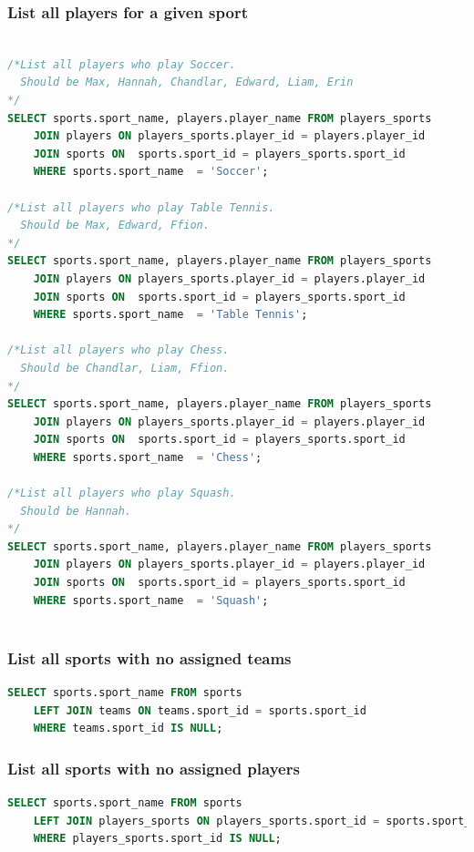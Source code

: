 \documentclass[11pt, article]{article}
\begin{document}
	\subsubsection{List all players for a given sport}
	\begin{lstlisting}[language=sql]

/*List all players who play Soccer.
  Should be Max, Hannah, Chandlar, Edward, Liam, Erin
*/
SELECT sports.sport_name, players.player_name FROM players_sports
	JOIN players ON players_sports.player_id = players.player_id
	JOIN sports ON  sports.sport_id = players_sports.sport_id
	WHERE sports.sport_name  = 'Soccer';

/*List all players who play Table Tennis.
  Should be Max, Edward, Ffion.
*/
SELECT sports.sport_name, players.player_name FROM players_sports
	JOIN players ON players_sports.player_id = players.player_id
	JOIN sports ON  sports.sport_id = players_sports.sport_id
	WHERE sports.sport_name  = 'Table Tennis';

/*List all players who play Chess.
  Should be Chandlar, Liam, Ffion.
*/
SELECT sports.sport_name, players.player_name FROM players_sports
	JOIN players ON players_sports.player_id = players.player_id
	JOIN sports ON  sports.sport_id = players_sports.sport_id
	WHERE sports.sport_name  = 'Chess';

/*List all players who play Squash.
  Should be Hannah.
*/
SELECT sports.sport_name, players.player_name FROM players_sports
	JOIN players ON players_sports.player_id = players.player_id
	JOIN sports ON  sports.sport_id = players_sports.sport_id
	WHERE sports.sport_name  = 'Squash';
	
	\end{lstlisting}

	\subsubsection{List all sports with no assigned teams}
	\begin{lstlisting}[language=sql]
SELECT sports.sport_name FROM sports
	LEFT JOIN teams ON teams.sport_id = sports.sport_id
	WHERE teams.sport_id IS NULL;
	\end{lstlisting}

	\subsubsection{List all sports with no assigned players}
	\begin{lstlisting}[language=sql]
SELECT sports.sport_name FROM sports 
	LEFT JOIN players_sports ON players_sports.sport_id = sports.sport_id
	WHERE players_sports.sport_id IS NULL;
	\end{lstlisting}
\end{document}
